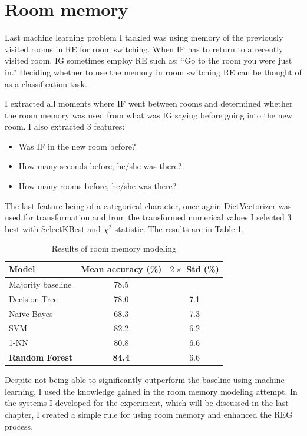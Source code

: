 \section{Room memory}
\label{sec:room-memory-ml}
Last machine learning problem I tackled was using memory of the previously visited rooms in RE for room switching. When IF has to return to a recently visited room, IG sometimes employ RE such as: ``Go to the room you were just in.'' Deciding whether to use the memory in room switching RE can be thought of as a classification task.

I extracted all moments where IF went between rooms and determined whether the room memory was used from what was IG saying before going into the new room. I also extracted 3 features:

\begin{itemize}
\item
Was IF in the new room before?
\item
How many seconds before, he/she was there?
\item
How many rooms before, he/she was there?
\end{itemize}

The last feature being of a categorical character, once again DictVectorizer was used for transformation and from the transformed numerical values I selected 3 best with SelectKBest and $\chi^2$ statistic. The results are in Table \ref{tab:history-ml}.

\begin{table}[!htbp]
 \centering
\begin{tabular}{lcc}
\toprule
Model    & Mean accuracy (\%) & $2\times$ Std (\%) \\
\midrule
 Majority baseline    & 78.5	& \\
\midrule
 Decision Tree 	& 78.0	& 7.1 	\\
 Naive Bayes  	& 68.3	& 7.3	\\
 SVM 			& 82.2	& 6.2 	\\
 1-NN			& 80.8	& 6.6 	\\
 \textbf{Random Forest}	& \textbf{84.4}	& 6.6	\\
\bottomrule
\end{tabular}
\caption{Results of room memory modeling}
\label{tab:history-ml}
\end{table}

Despite not being able to significantly outperform the baseline using machine learning, I used the knowledge gained in the room memory modeling attempt. In the systems I developed for the experiment, which will be discussed in the last chapter, I created a simple rule for using room memory and enhanced the REG process.

